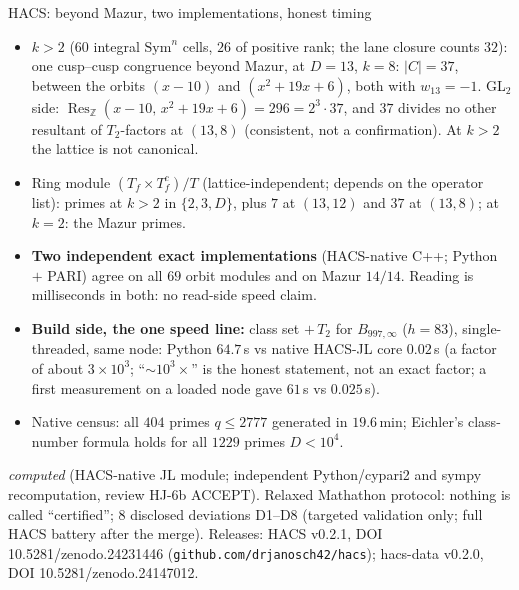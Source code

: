 \begin{frame}{HACS: beyond Mazur, two implementations, honest timing}
  \footnotesize
  \begin{itemize}
    \item \textbf{$k>2$} ($60$ integral $\mathrm{Sym}^n$ cells, $26$ of positive rank; the lane closure counts $32$): one cusp--cusp congruence beyond Mazur, at $D=13$, $k=8$: $|C|=37$,
      between the orbits $(x-10)$ and $(x^2+19x+6)$, both with $w_{13}=-1$. GL$_2$ side:
      $\operatorname{Res}_{\mathbb Z}(x-10,\,x^2+19x+6)=296=2^3\cdot 37$, and $37$ divides no other resultant of $T_2$-factors at $(13,8)$
      (consistent, not a confirmation). At $k>2$ the lattice is not canonical.
    \item Ring module $(T_f\times T_f^c)/T$ (lattice-independent; depends on the operator list): primes at $k>2$ in $\{2,3,D\}$,
      plus $7$ at $(13,12)$ and $37$ at $(13,8)$; at $k=2$: the Mazur primes.
    \item \textbf{Two independent exact implementations} (HACS-native C++; Python $+$ PARI) agree on all $69$ orbit modules and on Mazur $14/14$.
      Reading is milliseconds in both: no read-side speed claim.
    \item \textbf{Build side, the one speed line:} class set $+\,T_2$ for $B_{997,\infty}$ ($h=83$), single-threaded, same node:
      Python $64.7$\,s vs native HACS-JL core $0.02$\,s (a factor of about $3\times10^3$; ``$\sim10^3\times$'' is the honest statement, not an exact factor;
      a first measurement on a loaded node gave $61$\,s vs $0.025$\,s).
    \item Native census: all $404$ primes $q\le 2777$ generated in $19.6$\,min; Eichler's class-number formula holds for all $1229$ primes $D<10^4$.
  \end{itemize}
  \vfill
  {\tiny\sloppy \emph{computed} (HACS-native JL module; independent Python/cypari2 and sympy recomputation, review HJ-6b ACCEPT).
  Relaxed Mathathon protocol: nothing is called ``certified''; $8$ disclosed deviations D1--D8 (targeted validation only; full HACS battery after the merge).
  Releases: HACS v0.2.1, DOI 10.5281/zenodo.24231446 (\texttt{github.com/drjanosch42/hacs}); hacs-data v0.2.0, DOI 10.5281/zenodo.24147012.}
\end{frame}

